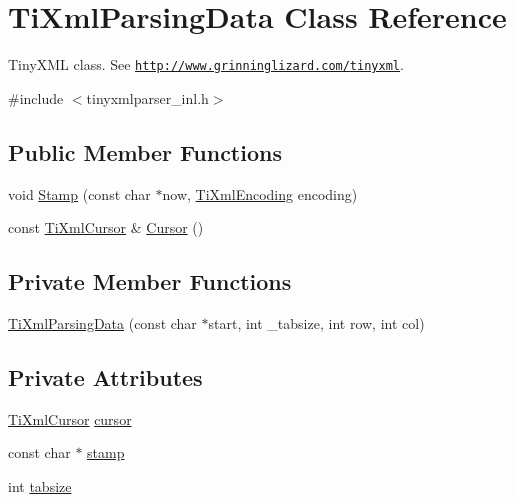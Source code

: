 \hypertarget{class_ti_xml_parsing_data}{}\section{Ti\+Xml\+Parsing\+Data Class Reference}
\label{class_ti_xml_parsing_data}


Tiny\+X\+ML class. See \href{http://www.grinninglizard.com/tinyxml}{\tt http\+://www.\+grinninglizard.\+com/tinyxml}.  




{\ttfamily \#include $<$tinyxmlparser\+\_\+inl.\+h$>$}

\subsection*{Public Member Functions}
\begin{DoxyCompactItemize}
\item 
void \hyperlink{class_ti_xml_parsing_data_a65cee8ab77a36c605db08c84b4c30a7d}{Stamp} (const char $\ast$now, \hyperlink{tinyxml_8h_a88d51847a13ee0f4b4d320d03d2c4d96}{Ti\+Xml\+Encoding} encoding)
\item 
const \hyperlink{struct_ti_xml_cursor}{Ti\+Xml\+Cursor} \& \hyperlink{class_ti_xml_parsing_data_a56908a17d7d7a6b2e511e62cf1d40d05}{Cursor} ()
\end{DoxyCompactItemize}
\subsection*{Private Member Functions}
\begin{DoxyCompactItemize}
\item 
\hyperlink{class_ti_xml_parsing_data_aa5beaf71579a91d6942277f417899ab9}{Ti\+Xml\+Parsing\+Data} (const char $\ast$start, int \+\_\+tabsize, int row, int col)
\end{DoxyCompactItemize}
\subsection*{Private Attributes}
\begin{DoxyCompactItemize}
\item 
\hyperlink{struct_ti_xml_cursor}{Ti\+Xml\+Cursor} \hyperlink{class_ti_xml_parsing_data_abee4c6c657f595182a4f8beda4fa1c7d}{cursor}
\item 
const char $\ast$ \hyperlink{class_ti_xml_parsing_data_a0e3c2ea5a8b738d733735ca0318fe4ff}{stamp}
\item 
int \hyperlink{class_ti_xml_parsing_data_ab9d6aea2833e38aaef440e49c22a05ca}{tabsize}
\end{DoxyCompactItemize}
